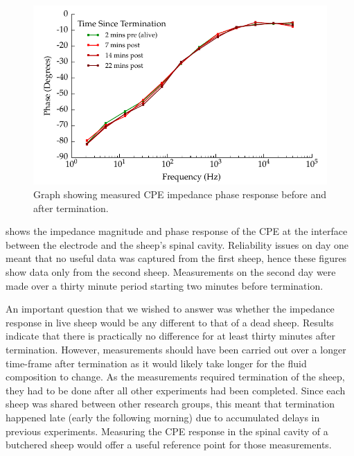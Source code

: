     \begin{figure}
      \centering
      \includegraphics{content/pt2/08-InterfaceParameters/graphics/graph_Day2_Sheep_CPE_ImpedancePhase}
      \caption{\label{fig:graph_Day2_Sheep_CPE_ImpedancePhase} Graph showing measured CPE impedance phase response before and after termination.} 
    \end{figure}
  
  
     shows the impedance magnitude and phase response of the CPE at the interface between the electrode and the sheep's spinal cavity.
    Reliability issues on day one meant that no useful data was captured from the first sheep, hence these figures show data only from the second sheep.
    Measurements on the second day were made over a thirty minute period starting two minutes before termination.
    
    An important question that we wished to answer was whether the impedance response in live sheep would be any different to that of a dead sheep.
    Results indicate that there is practically no difference for at least thirty minutes after termination.
    However, measurements should have been carried out over a longer time-frame after termination as it would likely take longer for the fluid composition to change.
    As the measurements required termination of the sheep, they had to be done after all other experiments had been completed.
    Since each sheep was shared between other research groups, this meant that termination happened late (early the following morning) due to accumulated delays in previous experiments.
    Measuring the CPE response in the spinal cavity of a butchered sheep would offer a useful reference point for those measurements.
    
